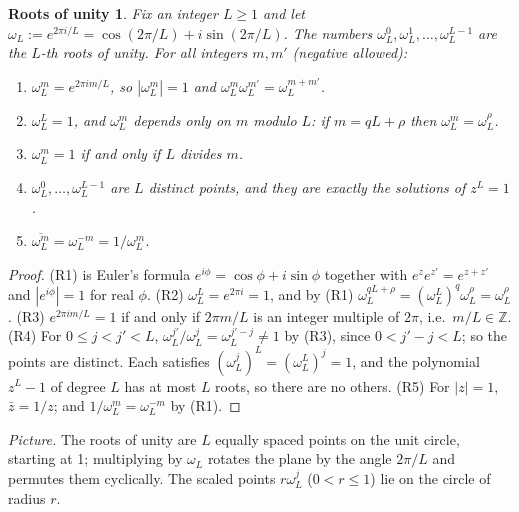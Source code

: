 \documentclass[11pt]{article}
\newtheorem*{rootsfacts}{Roots of unity}
\theoremstyle{definition}
\theoremstyle{remark}
\begin{document}
\begin{rootsfacts}
Fix an integer $L\ge1$ and let $\omega_L:=e^{2\pi i/L}=\cos(2\pi/L)+i\sin(2\pi/L)$. The numbers $\omega_L^0,\omega_L^1,\dots,\omega_L^{L-1}$ are the \emph{$L$-th roots of unity}. For all integers $m,m'$ (negative allowed):
\begin{enumerate}
\item[(R1)] $\omega_L^m=e^{2\pi im/L}$, so $|\omega_L^m|=1$ and $\omega_L^m\omega_L^{m'}=\omega_L^{m+m'}$.
\item[(R2)] $\omega_L^L=1$, and $\omega_L^m$ depends only on $m$ modulo $L$: if $m=qL+\rho$ then $\omega_L^m=\omega_L^\rho$.
\item[(R3)] $\omega_L^m=1$ if and only if $L$ divides $m$.
\item[(R4)] $\omega_L^0,\dots,\omega_L^{L-1}$ are $L$ distinct points, and they are exactly the solutions of $z^L=1$.
\item[(R5)] $\overline{\omega_L^m}=\omega_L^{-m}=1/\omega_L^m$.
\end{enumerate}
\end{rootsfacts}
\begin{proof}
(R1) is Euler's formula $e^{i\phi}=\cos\phi+i\sin\phi$ together with $e^{z}e^{z'}=e^{z+z'}$ and $|e^{i\phi}|=1$ for real $\phi$. (R2) $\omega_L^L=e^{2\pi i}=1$, and by (R1) $\omega_L^{qL+\rho}=(\omega_L^L)^q\omega_L^\rho=\omega_L^\rho$. (R3) $e^{2\pi im/L}=1$ if and only if $2\pi m/L$ is an integer multiple of $2\pi$, i.e.\ $m/L\in\mathbb Z$. (R4) For $0\le j<j'<L$, $\omega_L^{j'}/\omega_L^{j}=\omega_L^{j'-j}\ne1$ by (R3), since $0<j'-j<L$; so the points are distinct. Each satisfies $(\omega_L^j)^L=(\omega_L^L)^j=1$, and the polynomial $z^L-1$ of degree $L$ has at most $L$ roots, so there are no others. (R5) For $|z|=1$, $\bar z=1/z$; and $1/\omega_L^m=\omega_L^{-m}$ by (R1).
\end{proof}
\noindent \emph{Picture.} The roots of unity are $L$ equally spaced points on the unit circle, starting at 1; multiplying by $\omega_L$ rotates the plane by the angle $2\pi/L$ and permutes them cyclically. The scaled points $r\omega_L^j$ ($0<r\le1$) lie on the circle of radius $r$.
\end{document}
